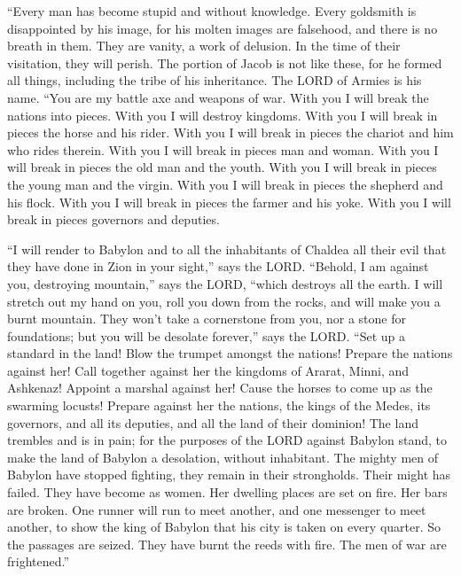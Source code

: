  ``Every man has become stupid and without knowledge. Every
goldsmith is disappointed by his image, for his molten images are
falsehood, and there is no breath in them.  They are
vanity, a work of delusion. In the time of their visitation, they will
perish.  The portion of Jacob is not like these, for he
formed all things, including the tribe of his inheritance. The LORD of
Armies is his name.  ``You are my battle axe and weapons of
war. With you I will break the nations into pieces. With you I will
destroy kingdoms.  With you I will break in pieces the
horse and his rider.  With you I will break in pieces the
chariot and him who rides therein. With you I will break in pieces man
and woman. With you I will break in pieces the old man and the youth.
With you I will break in pieces the young man and the virgin.
 With you I will break in pieces the shepherd and his
flock. With you I will break in pieces the farmer and his yoke. With you
I will break in pieces governors and deputies.

 ``I will render to Babylon and to all the inhabitants of
Chaldea all their evil that they have done in Zion in your sight,'' says
the LORD.  ``Behold, I am against you, destroying
mountain,'' says the LORD, ``which destroys all the earth. I will
stretch out my hand on you, roll you down from the rocks, and will make
you a burnt mountain.  They won't take a cornerstone from
you, nor a stone for foundations; but you will be desolate forever,''
says the LORD.  ``Set up a standard in the land! Blow the
trumpet amongst the nations! Prepare the nations against her! Call
together against her the kingdoms of Ararat, Minni, and Ashkenaz!
Appoint a marshal against her! Cause the horses to come up as the
swarming locusts!  Prepare against her the nations, the
kings of the Medes, its governors, and all its deputies, and all the
land of their dominion!  The land trembles and is in pain;
for the purposes of the LORD against Babylon stand, to make the land of
Babylon a desolation, without inhabitant.  The mighty men
of Babylon have stopped fighting, they remain in their strongholds.
Their might has failed. They have become as women. Her dwelling places
are set on fire. Her bars are broken.  One runner will run
to meet another, and one messenger to meet another, to show the king of
Babylon that his city is taken on every quarter.  So the
passages are seized. They have burnt the reeds with fire. The men of war
are frightened.''

